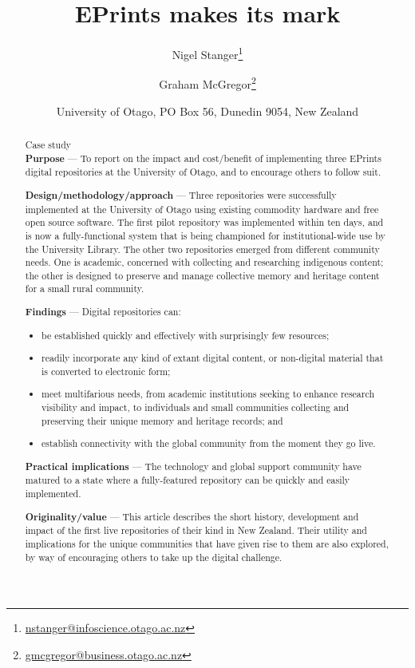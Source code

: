 \documentclass[12pt,pdftex,a4paper,titlepage]{article}
\title{EPrints makes its mark}
\author{Nigel Stanger\thanks{\protect\url{nstanger@infoscience.otago.ac.nz}} \and Graham McGregor\thanks{\protect\url{gmcgregor@business.otago.ac.nz}}}
\date{University of Otago, PO Box 56, Dunedin 9054, New Zealand}
\begin{document}
\maketitle




\begin{abstract}

\noindent Case study \\

\noindent\textbf{Purpose} --- To report on the impact and cost/benefit of implementing three EPrints digital repositories at the University of Otago, and to encourage others to follow suit.

\noindent\textbf{Design/methodology/approach} --- Three repositories were successfully implemented at the University of Otago using existing commodity hardware and free open source software. The first pilot repository was implemented within ten days, and is now a fully-functional system that is being championed for institutional-wide use by the University Library. The other two repositories emerged from different community needs. One is academic, concerned with collecting and researching indigenous content; the other is designed to preserve and manage collective memory and heritage content for a small rural community.

\noindent\textbf{Findings} --- Digital repositories can:
\begin{itemize}

	\item be established quickly and effectively with surprisingly few resources;
	
	\item readily incorporate any kind of extant digital content, or non-digital material that is converted to electronic form;
	
	\item meet multifarious needs, from academic institutions seeking to enhance research visibility and impact, to individuals and small communities collecting and preserving their unique memory and heritage records; and
	
	\item establish connectivity with the global community from the moment they go live.

\end{itemize}

\noindent\textbf{Practical implications} --- The technology and global support community have matured to a state where a fully-featured repository can be quickly and easily implemented.

\noindent\textbf{Originality/value} --- This article describes the short history, development and impact of the first live repositories of their kind in New Zealand. Their utility and implications for the unique communities that have given rise to them are also explored, by way of encouraging others to take up the digital challenge.
\end{abstract}
\end{document}
